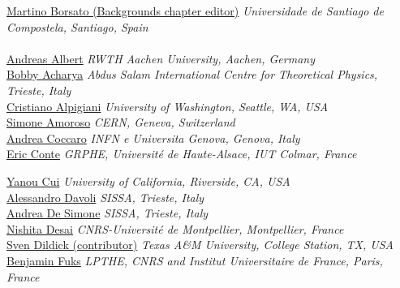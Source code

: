\noindent\href{mailto:martino.borsato@cern.ch}{Martino Borsato (Backgrounds chapter editor)} 
\emph{Universidade de Santiago de Compostela, Santiago, Spain}\\

\text{ \; }\\

\noindent\href{mailto:albert@physik.rwth-aachen.de}{Andreas Albert}
\emph{RWTH Aachen University, Aachen, Germany}\\

\noindent\href{mailto:bobby.samir.acharya@cern.ch}{Bobby Acharya}
\emph{Abdus Salam International Centre for Theoretical Physics, Trieste, Italy}\\

\noindent\href{mailto:cristiano.alpigiani@cern.ch}{Cristiano Alpigiani}
\emph{University of Washington, Seattle, WA, USA}\\

\noindent\href{mailto:simone.amoroso@cern.ch}{Simone Amoroso}
\emph{CERN, Geneva, Switzerland}\\

\noindent\href{mailto:andrea.coccaro@cern.ch}{Andrea Coccaro}
\emph{INFN e Universita Genova, Genova, Italy}\\

\noindent\href{mailto:eric.conte@iphc.cnrs.fr}{Eric Conte}
\emph{GRPHE, Universit\'{e} de Haute-Alsace, IUT Colmar, France}

\noindent\href{mailto:yanou.cui@ucr.edu}{Yanou Cui} 
\emph{University of California, Riverside, CA, USA}\\

\noindent\href{mailto:alessandro.davoli@sissa.it}{Alessandro Davoli} 
\emph{SISSA, Trieste, Italy}\\

\noindent\href{mailto:andrea.desimone@sissa.it}{Andrea De Simone} 
\emph{SISSA, Trieste, Italy}\\

\noindent\href{mailto:nishita.desai@umontpellier.fr}{Nishita Desai}
\emph{CNRS-Universit\'e de Montpellier, Montpellier, France}\\

\noindent\href{mailto:sven.dildick@cern.ch}{Sven Dildick (contributor)}
\emph{Texas A\&M University, College Station, TX, USA}\\

\noindent\href{mailto:fuks@lpthe.jussieu.fr}{Benjamin Fuks}
\emph{LPTHE, CNRS and Institut Universitaire de France, Paris, France}

